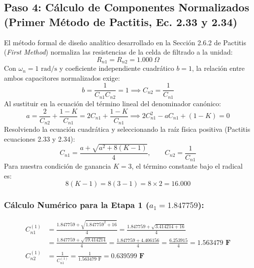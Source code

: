 \documentclass[a4paper,11pt]{article}
\begin{document}
\subsection{Paso 4: Cálculo de Componentes Normalizados (Primer Método de Pactitis, Ec. 2.33 y 2.34)}
El método formal de diseño analítico desarrollado en la Sección 2.6.2 de Pactitis (\textit{First Method}) normaliza las resistencias de la celda de filtrado a la unidad:
\begin{equation}
R_{n1} = R_{n2} = 1.000\ \Omega
\end{equation}
Con $\omega_n = 1\text{ rad/s}$ y coeficiente independiente cuadrático $b = 1$, la relación entre ambos capacitores normalizados exige:
\begin{equation}
b = \frac{1}{C_{n1} C_{n2}} = 1 \implies C_{n2} = \frac{1}{C_{n1}}
\end{equation}
Al sustituir en la ecuación del término lineal del denominador canónico:
\begin{equation}
a = \frac{2}{C_{n2}} + \frac{1 - K}{C_{n1}} = 2 C_{n1} + \frac{1 - K}{C_{n1}} \implies 2 C_{n1}^2 - a C_{n1} + (1 - K) = 0
\end{equation}
Resolviendo la ecuación cuadrática y seleccionando la raíz física positiva (Pactitis ecuaciones 2.33 y 2.34):
\begin{equation}
C_{n1} = \frac{a + \sqrt{a^2 + 8(K - 1)}}{4}, \qquad C_{n2} = \frac{1}{C_{n1}}
\end{equation}
Para nuestra condición de ganancia $K = 3$, el término constante bajo el radical es:
\begin{equation}
8(K - 1) = 8(3 - 1) = 8 \times 2 = \mathbf{16.000}
\end{equation}

\subsubsection{Cálculo Numérico para la Etapa 1 \texorpdfstring{($a_1 = 1.847759$)}{(a1 = 1.847759)}:}
\begin{align}
C_{n1}^{(1)} &= \frac{1.847759 + \sqrt{1.847759^2 + 16}}{4} = \frac{1.847759 + \sqrt{3.414214 + 16}}{4} \nonumber \\
             &= \frac{1.847759 + \sqrt{19.414214}}{4} = \frac{1.847759 + 4.406156}{4} = \frac{6.253915}{4} = \mathbf{1.563479\text{ F}} \\
C_{n2}^{(1)} &= \frac{1}{C_{n1}^{(1)}} = \frac{1}{1.563479\text{ F}} = \mathbf{0.639599\text{ F}}
\end{align}
\end{document}
